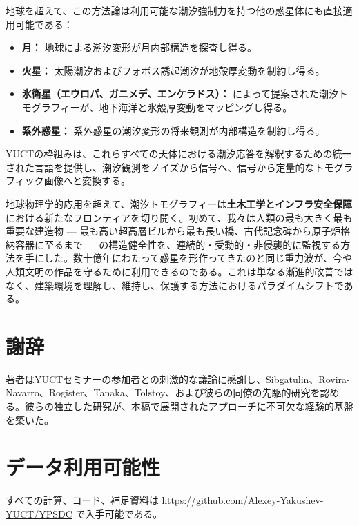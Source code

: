 \documentclass[12pt,a4paper]{article}
\theoremstyle{remark}
\begin{document}
	地球を超えて、この方法論は利用可能な潮汐強制力を持つ他の惑星体にも直接適用可能である：
	
	\begin{itemize}
		\item \textbf{月：} 地球による潮汐変形が月内部構造を探査し得る。
		\item \textbf{火星：} 太陽潮汐およびフォボス誘起潮汐が地殻厚変動を制約し得る。
		\item \textbf{氷衛星（エウロパ、ガニメデ、エンケラドス）：} \cite{RoviraNavarro2025} によって提案された潮汐トモグラフィーが、地下海洋と氷殻厚変動をマッピングし得る。
		\item \textbf{系外惑星：} 系外惑星の潮汐変形の将来観測が内部構造を制約し得る。
	\end{itemize}
	
	YUCTの枠組みは、これらすべての天体における潮汐応答を解釈するための統一された言語を提供し、潮汐観測をノイズから信号へ、信号から定量的なトモグラフィック画像へと変換する。
	
	地球物理学的応用を超えて、潮汐トモグラフィーは\textbf{土木工学とインフラ安全保障}における新たなフロンティアを切り開く。初めて、我々は人類の最も大きく最も重要な建造物 — 最も高い超高層ビルから最も長い橋、古代記念碑から原子炉格納容器に至るまで — の構造健全性を、連続的・受動的・非侵襲的に監視する方法を手にした。数十億年にわたって惑星を形作ってきたのと同じ重力波が、今や人類文明の作品を守るために利用できるのである。これは単なる漸進的改善ではなく、建築環境を理解し、維持し、保護する方法におけるパラダイムシフトである。
	
	\section*{謝辞}
	
	著者はYUCTセミナーの参加者との刺激的な議論に感謝し、Sibgatulin、Rovira-Navarro、Rogister、Tanaka、Tolstoy、および彼らの同僚の先駆的研究を認める。彼らの独立した研究が、本稿で展開されたアプローチに不可欠な経験的基盤を築いた。
	
	\section*{データ利用可能性}
	
	すべての計算、コード、補足資料は \url{https://github.com/Alexey-Yakushev-YUCT/YPSDC} で入手可能である。
	
\end{document}
